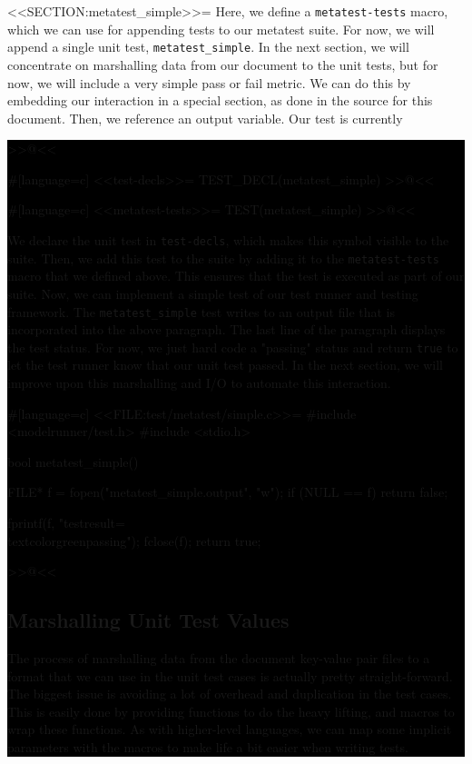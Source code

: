 <<SECTION:metatest_simple>>=
Here, we define a \verb/metatest-tests/ macro, which we can use for appending
tests to our metatest suite. For now, we will append a single unit test,
\verb/metatest_simple/. In the next section, we will concentrate on marshalling
data from our document to the unit tests, but for now, we will include a very
simple pass or fail metric.  We can do this by embedding our interaction in a
special section, as done in the source for this document. Then, we reference an
output variable. Our test is currently \colorbox{black}{%
>>@<<

#[language=c]
<<test-decls>>=
TEST_DECL(metatest_simple)
>>@<<

#[language=c]
<<metatest-tests>>=
TEST(metatest_simple)
>>@<<

We declare the unit test in \verb/test-decls/, which makes this symbol
visible to the suite. Then, we add this test to the suite by adding it to the
\verb/metatest-tests/ macro that we defined above. This ensures that the test is
executed as part of our suite.  Now, we can implement a simple test of our test
runner and testing framework.  The \verb/metatest_simple/ test writes to an
output file that is incorporated into the above paragraph. The last line of the
paragraph displays the test status. For now, we just hard code a "passing"
status and return \verb/true/ to let the test runner know that our unit test
passed. In the next section, we will improve upon this marshalling and I/O to
automate this interaction.

#[language=c]
<<FILE:test/metatest/simple.c>>=
#include <modelrunner/test.h>
#include <stdio.h>

bool metatest_simple()
{
    FILE* f = fopen("metatest_simple.output", "w");
    if (NULL == f)
    {
        return false;
    }

    fprintf(f, "testresult=\\textcolor{green}{passing}\n");
    fclose(f);
    return true;
}
>>@<<

\subsection{Marshalling Unit Test Values}

The process of marshalling data from the document key-value pair files to a
format that we can use in the unit test cases is actually pretty
straight-forward. The biggest issue is avoiding a lot of overhead and
duplication in the test cases.  This is easily done by providing functions to do
the heavy lifting, and macros to wrap these functions.  As with higher-level
languages, we can map some implicit parameters with the macros to make life a
bit easier when writing tests.

}

